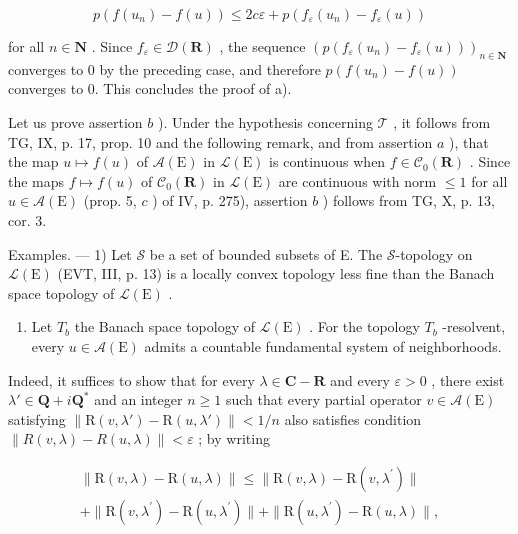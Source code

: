 \[
p (f (u _ {n}) - f (u)) \leqslant 2 c \varepsilon + p (f _ {\varepsilon} (u _ {n}) - f _ {\varepsilon} (u))
\]

for all \(n \in \mathbf{N}\) . Since \(f_{\varepsilon} \in \mathcal{D}(\mathbf{R})\) , the sequence \((p(f_{\varepsilon}(u_n) - f_{\varepsilon}(u)))_{n \in \mathbf{N}}\) converges to 0 by the preceding case, and therefore \(p(f(u_n) - f(u))\) converges to 0. This concludes the proof of a).

Let us prove assertion \(b\) ). Under the hypothesis concerning \(\mathcal{T}\) , it follows from TG, IX, p. 17, prop. 10 and the following remark, and from assertion \(a\) ), that the map \(u \mapsto f(u)\) of \(\mathcal{A}(\mathrm{E})\) in \(\mathcal{L}(\mathrm{E})\) is continuous when \(f \in \mathcal{C}_0(\mathbf{R})\) . Since the maps \(f \mapsto f(u)\) of \(\mathcal{C}_0(\mathbf{R})\) in \(\mathcal{L}(\mathrm{E})\) are continuous with norm \(\leqslant 1\) for all \(u \in \mathcal{A}(\mathrm{E})\) (prop. 5, \(c\) ) of IV, p. 275), assertion \(b\) ) follows from TG, X, p. 13, cor. 3.

Examples. --- 1) Let \(\mathscr{S}\) be a set of bounded subsets of E. The \(\mathscr{S}\)-topology on \(\mathcal{L}(\mathrm{E})\) (EVT, III, p. 13) is a locally convex topology less fine than the Banach space topology of \(\mathcal{L}(\mathrm{E})\) .

\begin{enumerate}
\def\labelenumi{\arabic{enumi})}
\setcounter{enumi}{1}
\tightlist
\item
  Let \(T_{b}\) the Banach space topology of \(\mathcal{L}(\mathrm{E})\) . For the topology \(T_{b}\) -resolvent, every \(u \in \mathcal{A}(\mathrm{E})\) admits a countable fundamental system of neighborhoods.
\end{enumerate}

Indeed, it suffices to show that for every \(\lambda \in \mathbf{C} - \mathbf{R}\) and every \(\varepsilon > 0\) , there exist \(\lambda' \in \mathbf{Q} + i\mathbf{Q}^*\) and an integer \(n \geqslant 1\) such that every partial operator \(v \in \mathcal{A}(\mathrm{E})\) satisfying \(\| \mathrm{R}(v, \lambda') - \mathrm{R}(u, \lambda')\| < 1/n\) also satisfies condition \(\|R(v,\lambda)-R(u,\lambda)\|<\varepsilon\) ; by writing

\[
\begin{array}{c} \| \mathrm{R} (v, \lambda) - \mathrm{R} (u, \lambda) \| \leqslant \| \mathrm{R} (v, \lambda) - \mathrm{R} (v, \lambda^ {\prime}) \| \\ + \| \mathrm{R} (v, \lambda^ {\prime}) - \mathrm{R} (u, \lambda^ {\prime}) \| + \| \mathrm{R} (u, \lambda^ {\prime}) - \mathrm{R} (u, \lambda) \|, \end{array}
\]

